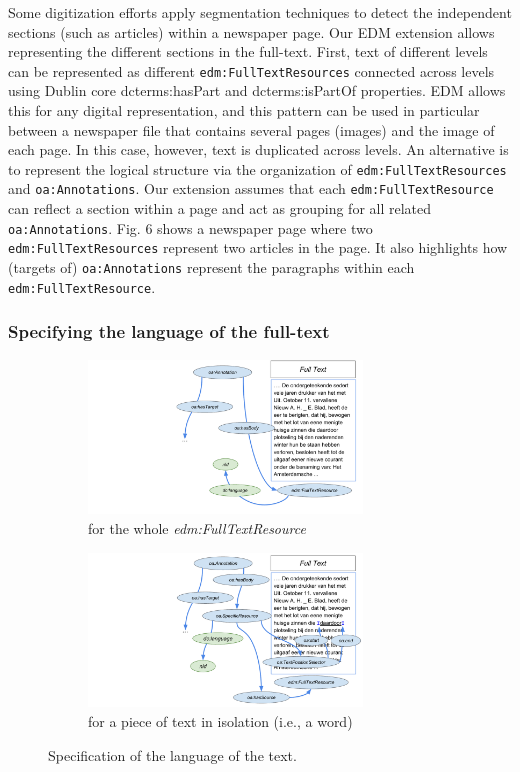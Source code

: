 \documentclass[a4paper,UKenglish,cleveref, autoref]{oasics-v2019}
\begin{document}
Some digitization efforts apply segmentation techniques to detect the independent sections (such as articles) within a newspaper page. Our EDM extension allows representing the different sections in the full-text. First, text of different levels can be represented as different \verb+edm:FullTextResources+ connected across levels using Dublin core dcterms:hasPart and dcterms:isPartOf properties. EDM allows this for any digital representation, and this pattern can be used in particular between a newspaper file that contains several pages (images) and the image of each page. In this case, however, text is duplicated across levels. An alternative is to represent the logical structure via the organization of \verb+edm:FullTextResources+ and \verb+oa:Annotations+. Our extension assumes that each \verb+edm:FullTextResource+ can reflect a section within a page and act as  grouping for all related \verb+oa:Annotations+. Fig. 6 shows a newspaper page where two \verb+edm:FullTextResources+ represent two articles in the page. It also highlights how (targets of) \verb+oa:Annotations+ represent the paragraphs within each \verb+edm:FullTextResource+.

\subsubsection{Specifying the language of the full-text}

\begin{figure}
  \begin{subfigure}[t]{0.5\textwidth}
    \centering
    \includegraphics[width=0.8\textwidth]{Fig7a}
    \caption{for the whole \emph{edm:FullTextResource}}
  \end{subfigure}\hfill
  \begin{subfigure}[t]{0.5\textwidth}
    \centering
    \includegraphics[width=0.8\textwidth]{Fig7b}
    \caption{for a piece of text in isolation (i.e., a word)}
  \end{subfigure}
  \caption{Specification of the language of the text.}\label{fig:example}
\end{figure}
\end{document}
